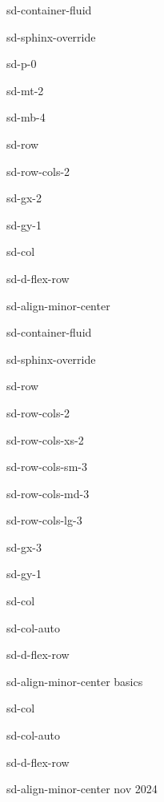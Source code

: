 \documentclass[letterpaper,10pt,italian]{jupyterBook}
\begin{document}
\begin{sphinxuseclass}{sd-container-fluid}
\begin{sphinxuseclass}{sd-sphinx-override}
\begin{sphinxuseclass}{sd-p-0}
\begin{sphinxuseclass}{sd-mt-2}
\begin{sphinxuseclass}{sd-mb-4}
\begin{sphinxuseclass}{sd-row}
\begin{sphinxuseclass}{sd-row-cols-2}
\begin{sphinxuseclass}{sd-gx-2}
\begin{sphinxuseclass}{sd-gy-1}
\begin{sphinxuseclass}{sd-col}
\begin{sphinxuseclass}{sd-d-flex-row}
\begin{sphinxuseclass}{sd-align-minor-center}
\begin{sphinxuseclass}{sd-container-fluid}
\begin{sphinxuseclass}{sd-sphinx-override}
\begin{sphinxuseclass}{sd-row}
\begin{sphinxuseclass}{sd-row-cols-2}
\begin{sphinxuseclass}{sd-row-cols-xs-2}
\begin{sphinxuseclass}{sd-row-cols-sm-3}
\begin{sphinxuseclass}{sd-row-cols-md-3}
\begin{sphinxuseclass}{sd-row-cols-lg-3}
\begin{sphinxuseclass}{sd-gx-3}
\begin{sphinxuseclass}{sd-gy-1}
\begin{sphinxuseclass}{sd-col}
\begin{sphinxuseclass}{sd-col-auto}
\begin{sphinxuseclass}{sd-d-flex-row}
\begin{sphinxuseclass}{sd-align-minor-center}
\sphinxAtStartPar
basics

\end{sphinxuseclass}
\end{sphinxuseclass}
\end{sphinxuseclass}
\end{sphinxuseclass}
\begin{sphinxuseclass}{sd-col}
\begin{sphinxuseclass}{sd-col-auto}
\begin{sphinxuseclass}{sd-d-flex-row}
\begin{sphinxuseclass}{sd-align-minor-center}
 nov 2024


\end{sphinxuseclass}
\end{sphinxuseclass}
\end{sphinxuseclass}
\end{sphinxuseclass}
\end{sphinxuseclass}
\end{sphinxuseclass}
\end{sphinxuseclass}
\end{sphinxuseclass}
\end{sphinxuseclass}
\end{sphinxuseclass}
\end{sphinxuseclass}
\end{sphinxuseclass}
\end{sphinxuseclass}
\end{sphinxuseclass}
\end{sphinxuseclass}
\end{sphinxuseclass}
\end{sphinxuseclass}
\end{sphinxuseclass}
\end{sphinxuseclass}
\end{sphinxuseclass}
\end{sphinxuseclass}
\end{sphinxuseclass}
\end{sphinxuseclass}
\end{sphinxuseclass}
\end{sphinxuseclass}
\end{sphinxuseclass}
\end{document}
